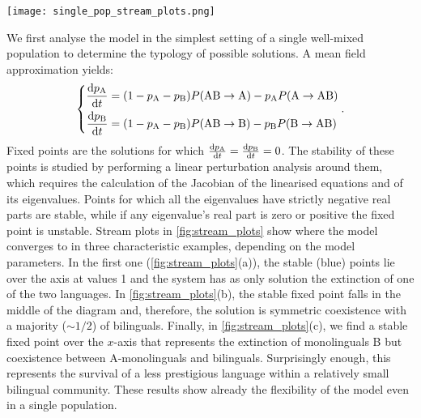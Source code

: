 \documentclass[../thesis.tex]{subfiles}
\begin{document}
\begin{figure*}
    \centering
    \texttt{[image: single\_pop\_stream\_plots.png]}
    \caption{Flow diagrams for the dynamics of two languages according to our model
    described in \cref{eq:bipref_model} set in a well-mixed population. $p_{\text{A}}$
    and $p_{\text{B}}$ denote the proportions of monolinguals in A and B, respectively,
    and the proportion of bilinguals $p_{\text{AB}}$ is such that $p_{\text{A}} +
    p_{\text{B}} + p_{\text{AB}} = 1$. The mortality rate is fixed at $\mu = 0.02$. (a)
    For $s = q = 1/2$ and $c=0.02$, the stable outcome is extinction of one of the two
    languages. (b) For $s = q = 1/2$ and $c = 0.05$, the higher learning rate leads to a
    solution featuring stable coexistence. (c) For $s = 0.57$, $q = 0.45$ and $c =
    0.05$, despite the lower prestige, B survives in a small community of bilinguals as
    it is the preferred language among them.}
    \label{fig:stream_plots}
\end{figure*}

We first analyse the model in the simplest setting of a single well-mixed population to
determine the typology of possible solutions. A mean field approximation yields:
\begin{equation}
    \label{eq:dt_bipref_model}
    \left\{
    \begin{aligned}
        \dv{p_\text{A}}{t} &= (1 - p_\text{A} - p_\text{B}) P (\text{AB} \rightarrow \text{A})
            - p_\text{A} P (\text{A} \rightarrow \text{AB})
        \\
        \dv{p_\text{B}}{t} &= (1 - p_\text{A} - p_\text{B}) P (\text{AB} \rightarrow \text{B})
            - p_\text{B} P (\text{B} \rightarrow \text{AB})
    \end{aligned}
    \right. .
\end{equation}
Fixed points are the solutions for which $\dv{p_\text{A}}{t} = \dv{p_\text{B}}{t} = 0$.
The stability of these points is studied by performing a linear perturbation analysis
around them, which requires the calculation of the Jacobian of the linearised equations
and of its eigenvalues. Points for which all the eigenvalues have strictly negative real
parts are stable, while if any eigenvalue's real part is zero or positive the fixed
point is unstable. Stream plots in \cref{fig:stream_plots} show where the model
converges to in three characteristic examples, depending on the model parameters. In the
first one (\cref{fig:stream_plots}(a)), the stable (blue) points lie over the axis at
values 1 and the system has as only solution the extinction of one of the two languages.
In \cref{fig:stream_plots}(b), the stable fixed point falls in the middle of the diagram
and, therefore, the solution is symmetric coexistence with a majority ($\sim 1/2$) of
bilinguals. Finally, in \cref{fig:stream_plots}(c), we find a stable fixed point over
the $x$-axis that represents the extinction of monolinguals B but coexistence between
A-monolinguals and bilinguals. Surprisingly enough, this represents the survival of a
less prestigious language within a relatively small bilingual community. These results
show already the flexibility of the model even in a single population.
\end{document}
